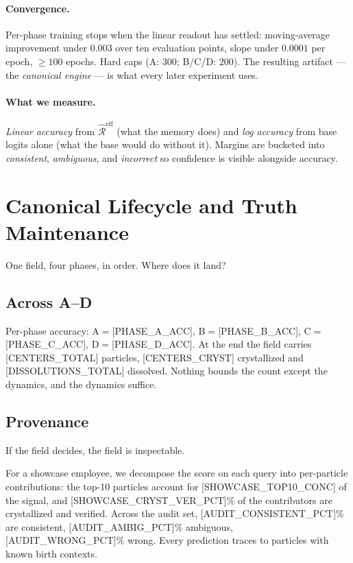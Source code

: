 \documentclass[11pt,twocolumn]{article}
\newcommand{\Coheff}{\widehat{\mathcal{R}}^{\mathrm{eff}}}
\newcommand{\PH}[1]{[\textsc{#1}]}
\theoremstyle{plain}
\begin{document}
\paragraph{Convergence.}
Per-phase training stops when the linear readout has settled: moving-average improvement under $0.003$ over ten evaluation points, slope under $0.0001$ per epoch, $\geq 100$ epochs. Hard caps (A: $300$; B/C/D: $200$). The resulting artifact --- the \emph{canonical engine} --- is what every later experiment uses.

\paragraph{What we measure.}
\emph{Linear accuracy} from $\Coheff$ (what the memory does) and \emph{log accuracy} from base logits alone (what the base would do without it). Margins are bucketed into \emph{consistent}, \emph{ambiguous}, and \emph{incorrect} so confidence is visible alongside accuracy.

\section{Canonical Lifecycle and Truth Maintenance}
\label{sec:lifecycle}

One field, four phases, in order. Where does it land?

\subsection{Across A--D}

Per-phase accuracy: $\mathrm{A}{=}$\PH{PHASE\_A\_ACC}, $\mathrm{B}{=}$\PH{PHASE\_B\_ACC}, $\mathrm{C}{=}$\PH{PHASE\_C\_ACC}, $\mathrm{D}{=}$\PH{PHASE\_D\_ACC}. At the end the field carries \PH{CENTERS\_TOTAL} particles, \PH{CENTERS\_CRYST} crystallized and \PH{DISSOLUTIONS\_TOTAL} dissolved. Nothing bounds the count except the dynamics, and the dynamics suffice.

\subsection{Provenance}

If the field decides, the field is inspectable.

For a showcase employee, we decompose the score on each query into per-particle contributions: the top-10 particles account for \PH{SHOWCASE\_TOP10\_CONC} of the signal, and \PH{SHOWCASE\_CRYST\_VER\_PCT}\% of the contributors are crystallized and verified. Across the audit set, \PH{AUDIT\_CONSISTENT\_PCT}\% are consistent, \PH{AUDIT\_AMBIG\_PCT}\% ambiguous, \PH{AUDIT\_WRONG\_PCT}\% wrong. Every prediction traces to particles with known birth contexts.
\end{document}
